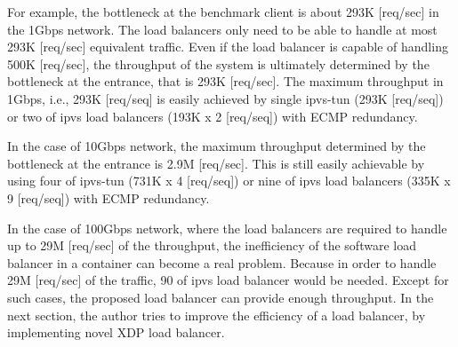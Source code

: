 For example, the bottleneck at the benchmark client is about 293K [req/sec] in the 1Gbps network. 
The load balancers only need to be able to handle at most 293K [req/sec] equivalent traffic.
Even if the load balancer is capable of handling 500K [req/sec], the throughput of the system is ultimately determined by the bottleneck at the entrance, that is 293K [req/sec].
The maximum throughput in 1Gbps, i.e., 293K [req/seq] is easily achieved by single ipvs-tun (293K [req/seq]) or two of ipvs load balancers (193K x 2 [req/seq]) with ECMP redundancy.

In the case of 10Gbps network, the maximum throughput determined by the bottleneck at the entrance is 2.9M [req/sec].
This is still easily achievable by using four of ipvs-tun (731K x 4 [req/seq]) or nine of ipvs load balancers (335K x 9 [req/seq]) with ECMP redundancy.

In the case of 100Gbps network, where the load balancers are required to handle up to 29M [req/sec] of the throughput, the inefficiency of the software load balancer in a container can become a real problem.
Because in order to handle 29M [req/sec] of the traffic, 90 of ipvs load balancer would be needed.
Except for such cases, the proposed load balancer can provide enough throughput.
In the next section, the author tries to improve the efficiency of a load balancer, by implementing novel XDP load balancer.


